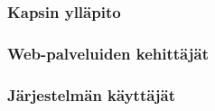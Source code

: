 

\subsubsection{Kapsin ylläpito}


\subsubsection{Web-palveluiden kehittäjät}


\subsubsection{Järjestelmän käyttäjät}
